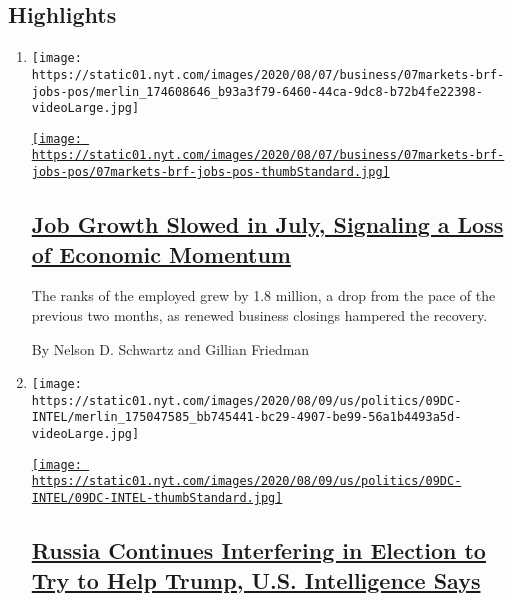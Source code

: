 \hypertarget{highlights}{%
\subsection{Highlights}\label{highlights}}

\begin{enumerate}
\def\labelenumi{\arabic{enumi}.}
\item
  \texttt{[image: https://static01.nyt.com/images/2020/08/07/business/07markets-brf-jobs-pos/merlin\_174608646\_b93a3f79-6460-44ca-9dc8-b72b4fe22398-videoLarge.jpg]}

  \href{/2020/08/07/business/economy/july-jobs-report.html}{\texttt{[image: https://static01.nyt.com/images/2020/08/07/business/07markets-brf-jobs-pos/07markets-brf-jobs-pos-thumbStandard.jpg]}}

  \hypertarget{job-growth-slowed-in-july-signaling-a-loss-of-economic-momentum}{%
  \subsection{\texorpdfstring{\href{/2020/08/07/business/economy/july-jobs-report.html}{Job
  Growth Slowed in July, Signaling a Loss of Economic
  Momentum}}{Job Growth Slowed in July, Signaling a Loss of Economic Momentum}}\label{job-growth-slowed-in-july-signaling-a-loss-of-economic-momentum}}

  The ranks of the employed grew by 1.8 million, a drop from the pace of
  the previous two months, as renewed business closings hampered the
  recovery.

  By Nelson D. Schwartz and Gillian Friedman
\item
  \texttt{[image: https://static01.nyt.com/images/2020/08/09/us/politics/09DC-INTEL/merlin\_175047585\_bb745441-bc29-4907-be99-56a1b4493a5d-videoLarge.jpg]}

  \href{/2020/08/07/us/politics/russia-china-trump-biden-election-interference.html}{\texttt{[image: https://static01.nyt.com/images/2020/08/09/us/politics/09DC-INTEL/09DC-INTEL-thumbStandard.jpg]}}

  \hypertarget{russia-continues-interfering-in-election-to-try-to-help-trump-us-intelligence-says}{%
  \subsection{\texorpdfstring{\href{/2020/08/07/us/politics/russia-china-trump-biden-election-interference.html}{Russia
  Continues Interfering in Election to Try to Help Trump, U.S.
  Intelligence
  Says}}{Russia Continues Interfering in Election to Try to Help Trump, U.S. Intelligence Says}}\label{russia-continues-interfering-in-election-to-try-to-help-trump-us-intelligence-says}}


\end{enumerate}
